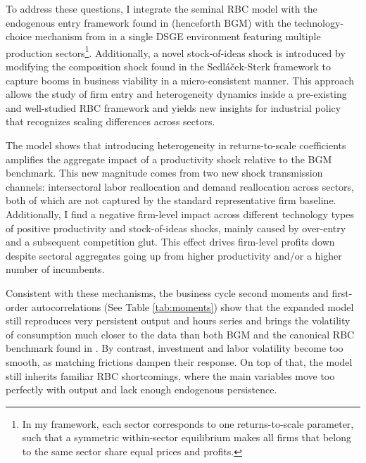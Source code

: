 \documentclass[a4paper,12pt]{article} %
\numberwithin{equation}{section} %
\numberwithin{figure}{section}
\numberwithin{table}{section}
\begin{document}
To address these questions, I integrate the seminal RBC model with the endogenous entry framework found in \textcite{bilbiie2012endogenous} (henceforth BGM) 
with the technology-choice mechanism from \textcite{sedlavcek2017growth} in a single DSGE environment featuring multiple production sectors\footnote{In my framework, 
each sector corresponds to one 
returns-to-scale parameter, such that a symmetric within-sector equilibrium makes all firms that belong to the same sector share equal prices and profits.}. 
Additionally, a novel stock-of-ideas shock is introduced by modifying the composition shock found in the 
Sedláček-Sterk framework to capture booms in business viability in a micro-consistent manner. This approach allows the study of
firm entry and heterogeneity dynamics inside a pre-existing and well-studied RBC framework and yields new insights for industrial 
policy that recognizes scaling differences across sectors.

The model shows that introducing heterogeneity in returns-to-scale coefficients amplifies the aggregate impact of a productivity shock relative 
to the BGM benchmark. This new magnitude comes from two new shock transmission channels: intersectoral 
labor reallocation and demand reallocation across sectors, both of which are not captured by the standard representative firm baseline. Additionally,
I find a negative firm-level impact across different technology types of positive productivity and stock-of-ideas shocks, mainly caused by over-entry
and a subsequent competition glut. This effect drives firm-level profits down despite sectoral aggregates going up from higher productivity and/or 
a higher number of incumbents.

Consistent with these mechanisms, the business cycle second moments and first-order autocorrelations (See Table \ref{tab:moments}) 
show that the expanded model still reproduces very persistent output and hours series and brings the volatility of consumption much 
closer to the data than both BGM and the canonical RBC benchmark found in \textcite{king1999resuscitating}. 
By contrast, investment and labor volatility become too smooth, as matching frictions dampen their response. 
On top of that, the model still inherits familiar RBC shortcomings, where the main variables move too perfectly with output and lack enough endogenous persistence.
\end{document}
